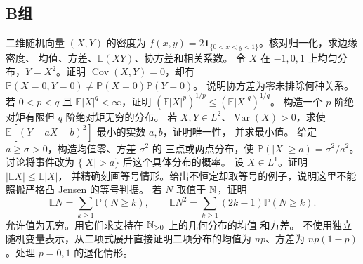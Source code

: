 \subsection*{B组}
\begin{enumerate}[label=\textbf{\thechapter.\arabic*.},resume]
二维随机向量 \((X,Y)\) 的密度为
\(f(x,y)=2\mathbf1_{\{0<x<y<1\}}\)。核对归一化，求边缘密度、
均值、方差、\(\mathbb E(XY)\)、协方差和相关系数。
令 \(X\) 在 \(-1,0,1\) 上均匀分布，\(Y=X^2\)。证明
\(\operatorname{Cov}(X,Y)=0\)，却有
\(\mathbb P(X=0,Y=0)\ne\mathbb P(X=0)\mathbb P(Y=0)\)。
说明协方差为零未排除何种关系。
若 \(0<p<q\) 且 \(\mathbb E|X|^q<\infty\)，证明
\((\mathbb E|X|^p)^{1/p}\le(\mathbb E|X|^q)^{1/q}\)。
构造一个 \(p\) 阶绝对矩有限但 \(q\) 阶绝对矩无穷的分布。
若 \(X,Y\in L^2\)、\(\operatorname{Var}(X)>0\)，求使
\(\mathbb E[(Y-aX-b)^2]\) 最小的实数 \(a,b\)，证明唯一性，
并求最小值。
给定 \(a\ge\sigma>0\)，构造均值零、方差 \(\sigma^2\) 的
三点或两点分布，使
\(\mathbb P(|X|\ge a)=\sigma^2/a^2\)。讨论将事件改为
\(\{|X|>a\}\) 后这个具体分布的概率。
设 \(X\in L^1\)。证明 \(|\mathbb E X|\le\mathbb E|X|\)，
并精确刻画等号情形。给出不恒定却取等号的例子，说明这里不能
照搬严格凸 Jensen 的等号判据。
若 \(N\) 取值于 \(\mathbb{N}\)，证明
\[
 \mathbb E N=\sum_{k\ge1}\mathbb P(N\ge k),\qquad
 \mathbb E N^2=\sum_{k\ge1}(2k-1)\mathbb P(N\ge k).
\]
允许值为无穷。用它们求支持在 \(\mathbb{N}_{>0}\) 上的几何分布的均值
和方差。
不使用独立随机变量表示，从二项式展开直接证明二项分布的均值为
\(np\)、方差为 \(np(1-p)\)。处理 \(p=0,1\) 的退化情形。
\end{enumerate}

